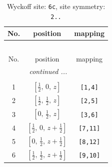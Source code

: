 \documentclass[fleqn,8pt]{jsarticle}
\begin{document}
\renewcommand{\arraystretch}{1.2}
\begin{longtable}{ccc}
\caption{Wyckoff site: {\tt 6c}, site symmetry: {\tt 2..}}
 \\
 \hline \hline
No. & position & mapping \\ \hline \endfirsthead

\multicolumn{2}{l}{\tablename\ \thetable{}} \\
 \hline \hline
No. & position & mapping \\ \hline \endhead

 \hline \hline
\multicolumn{2}{r}{\footnotesize\it continued ...} \\ \endfoot

 \hline \hline
\multicolumn{2}{r}{} \\ \endlastfoot

1 & $\left[ \frac{1}{2},\, 0,\, z \right]$ & {\tt [1,4]} \\ \hline
2 & $\left[ \frac{1}{2},\, \frac{1}{2},\, z \right]$ & {\tt [2,5]} \\ \hline
3 & $\left[ 0,\, \frac{1}{2},\, z \right]$ & {\tt [3,6]} \\ \hline
4 & $\left[ \frac{1}{2},\, 0,\, z + \frac{1}{2} \right]$ & {\tt [7,11]} \\ \hline
5 & $\left[ 0,\, \frac{1}{2},\, z + \frac{1}{2} \right]$ & {\tt [8,12]} \\ \hline
6 & $\left[ \frac{1}{2},\, \frac{1}{2},\, z + \frac{1}{2} \right]$ & {\tt [9,10]} \\
\end{longtable}
\renewcommand{\arraystretch}{1.2}
\end{document}
